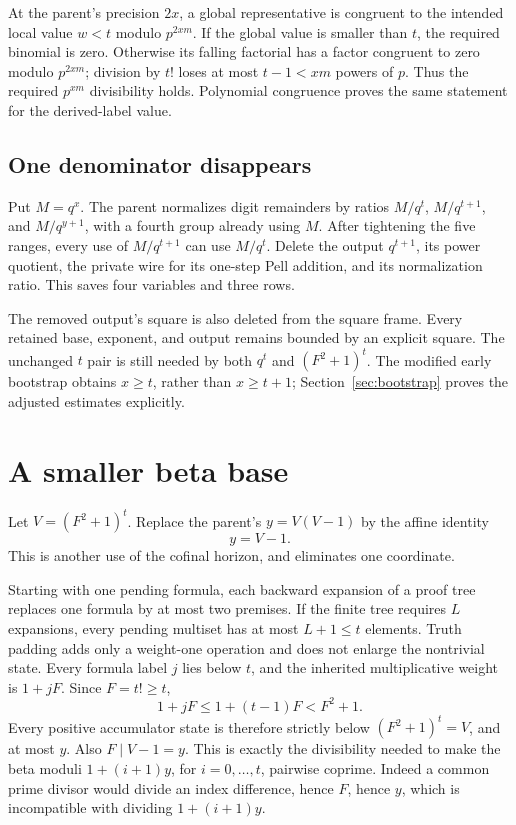 \documentclass[11pt,letterpaper]{article}
\theoremstyle{definition}\newtheorem{definition}[theorem]{Definition}
\theoremstyle{remark}\newtheorem{remark}[theorem]{Remark}
\begin{document}
At the parent's precision \(2x\), a global representative is congruent
to the intended local value \(w<t\) modulo \(p^{2xm}\). If the global
value is smaller than \(t\), the required binomial is zero. Otherwise
its falling factorial has a factor congruent to zero modulo
\(p^{2xm}\); division by \(t!\) loses at most \(t-1<xm\) powers of
\(p\). Thus the required \(p^{xm}\) divisibility holds. Polynomial
congruence proves the same statement for the derived-label value.

\subsection{One denominator disappears}

Put \(M=q^x\). The parent normalizes digit remainders by ratios
\(M/q^t\), \(M/q^{t+1}\), and \(M/q^{y+1}\), with a fourth group
already using \(M\). After tightening the five ranges, every use of
\(M/q^{t+1}\) can use \(M/q^t\). Delete the output \(q^{t+1}\), its
power quotient, the private wire for its one-step Pell addition, and its
normalization ratio. This saves four variables and three rows.

The removed output's square is also deleted from the square frame.
Every retained base, exponent, and output remains bounded by an explicit
square. The unchanged \(t\) pair is still needed by both \(q^t\) and
\((F^2+1)^t\). The modified early bootstrap obtains \(x\ge t\), rather
than \(x\ge t+1\); Section~\ref{sec:bootstrap} proves the adjusted
estimates explicitly.

\section{A smaller beta base}
\label{sec:beta}

Let \(V=(F^2+1)^t\). Replace the parent's
\(y=V(V-1)\) by the affine identity
\begin{equation}\label{eq:beta}
y=V-1.
\end{equation}
This is another use of the cofinal horizon, and eliminates one coordinate.

Starting with one pending formula, each backward expansion of a proof
tree replaces one formula by at most two premises. If the finite tree
requires \(L\) expansions, every pending multiset has at most
\(L+1\le t\) elements. Truth padding adds only a weight-one operation
and does not enlarge the nontrivial state. Every formula label \(j\)
lies below \(t\), and the inherited multiplicative weight is
\(1+jF\). Since \(F=t!\ge t\),
\[
1+jF\le1+(t-1)F<F^2+1.
\]
Every positive accumulator state is therefore strictly below
\((F^2+1)^t=V\), and at most \(y\). Also \(F\mid V-1=y\).
This is exactly the divisibility needed to make the beta moduli
\(1+(i+1)y\), for \(i=0,\ldots,t\), pairwise coprime. Indeed a common
prime divisor would divide an index difference, hence \(F\), hence
\(y\), which is incompatible with dividing \(1+(i+1)y\).
\end{document}
